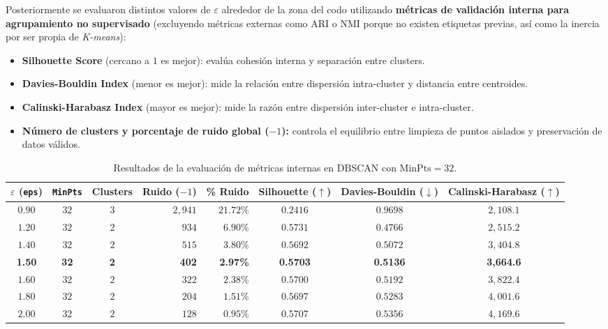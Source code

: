 \documentclass[12pt,a4paper]{article}
\begin{document}
Posteriormente se evaluaron distintos valores de $\varepsilon$ alrededor de la zona del codo utilizando \textbf{métricas de validación interna para agrupamiento no supervisado} (excluyendo métricas externas como ARI o NMI porque no existen etiquetas previas, así como la inercia por ser propia de \textit{K-means}):
\begin{itemize}[leftmargin=0.8cm]
    \item \textbf{Silhouette Score} (cercano a $1$ es mejor): evalúa cohesión interna y separación entre clusters.
    \item \textbf{Davies-Bouldin Index} (menor es mejor): mide la relación entre dispersión intra-cluster y distancia entre centroides.
    \item \textbf{Calinski-Harabasz Index} (mayor es mejor): mide la razón entre dispersión inter-cluster e intra-cluster.
    \item \textbf{Número de clusters y porcentaje de ruido global ($-1$):} controla el equilibrio entre limpieza de puntos aislados y preservación de datos válidos.
\end{itemize}

\begin{table}[H]
    \centering
    \caption{Resultados de la evaluación de métricas internas en DBSCAN con $\text{MinPts} = 32$.}
    \label{tab:metricas_dbscan}
    \begin{tabular}{@{} c c c r r c c c @{}}
        \toprule
        $\varepsilon$ (\texttt{eps}) & \texttt{MinPts} & Clusters & Ruido ($-1$) & \% Ruido & Silhouette ($\uparrow$) & Davies-Bouldin ($\downarrow$) & Calinski-Harabasz ($\uparrow$) \\
        \midrule
        $0.90$ & $32$ & $3$ & $2{,}941$ & $21.72\%$ & $0.2416$ & $0.9698$ & $2{,}108.1$ \\
        $1.20$ & $32$ & $2$ & $934$   & $6.90\%$  & $0.5731$ & $0.4766$ & $2{,}515.2$ \\
        $1.40$ & $32$ & $2$ & $515$   & $3.80\%$  & $0.5692$ & $0.5072$ & $3{,}404.8$ \\
        \textbf{1.50} & \textbf{32} & \textbf{2} & \textbf{402} & \textbf{2.97\%} & \textbf{0.5703} & \textbf{0.5136} & \textbf{3,664.6} \\
        $1.60$ & $32$ & $2$ & $322$   & $2.38\%$  & $0.5700$ & $0.5192$ & $3{,}822.4$ \\
        $1.80$ & $32$ & $2$ & $204$   & $1.51\%$  & $0.5697$ & $0.5283$ & $4{,}001.6$ \\
        $2.00$ & $32$ & $2$ & $128$   & $0.95\%$  & $0.5707$ & $0.5356$ & $4{,}169.6$ \\
        \bottomrule
    \end{tabular}
\end{table}
\end{document}

